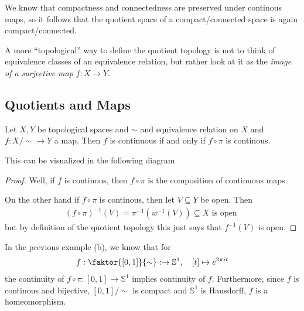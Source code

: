 We know that compactness and connectedness are preserved under continous maps, so it follows that the quotient space of a compact/connected space is again compact/connected.

A more ``topological'' way to define the quotient topology is not to think of equivalence classes of an equivalence relation, but rather look at it as the \emph{image of a surjective map} $f: X \to Y$.

\subsection{Quotients and Maps}
\begin{lem}[]\label{lem:unipropquot}
Let $X,Y$ be topological spaces and $\sim$ and equivalence relation on $X$ and $f: X/\sim \to Y$ a map.
Then $f$ is continuous if and only if $f \circ \pi$ is continous.

This can be visualized in the following diagram
\begin{center}
\end{center}
\end{lem}
\begin{proof}
Well, if $f$ is continous, then $f \circ \pi$ is the composition of continuous maps.

On the other hand if $f \circ \pi$ is continous, then let $V \subseteq Y$ be open. Then
\begin{align*}
  (f \circ \pi)^{-1}(V) = \pi^{-1}(w^{-1}(V))\subseteq X \text{ is open }
\end{align*}
but by definition of the quotient topology this just says that $f^{-1}(V)$ is open.
\end{proof}

In the previous example (b), we know that for
\begin{align*}
  f: \faktor{[0,1]}{\sim}: \to  \mathbb{S}^{1}, \quad [t] \mapsto e^{2 \pi i t}
\end{align*}
the continuity of $f \circ \pi: [0,1] \to \mathbb{S}^{1}$ implies continuity of $f$.
Furthermore, since $f$ is continous and bijective, $[0,1]/\sim$ is compact and $\mathbb{S}^{1}$ is Hausdorff, $f$ is a homeomorphism.


